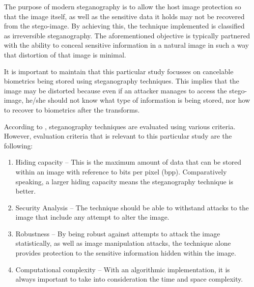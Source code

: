 The purpose of modern steganography is to allow the host image protection so that the image itself, as well as the sensitive data it holds may not be recovered from the stego-image. By achieving this, the technique implemented is classified as irreversible steganography. The aforementioned objective is typically partnered with the ability to conceal sensitive information in a natural image in such a way that distortion of that image is minimal.

It is important to maintain that this particular study focusses on cancelable biometrics being stored using steganography techniques. This implies that the image may be distorted because even if an attacker manages to access the stego-image, he/she should not know what type of information is being stored, nor how to recover to biometrics after the transforms. 

According to \cite{Jain2016, Pradhan2016}, steganography techniques are evaluated using various criteria. However, evaluation criteria that is relevant to this particular study are the following:

\begin{enumerate}[label=\roman*.]
	
	\item Hiding capacity – This is the maximum amount of data that can be stored within an image with reference to bits per pixel (bpp). Comparatively speaking, a larger hiding capacity means the steganography technique is better.
	
	\item Security Analysis – The technique should be able to withstand attacks to the image that include any attempt to alter the image.
	
	\item Robustness – By being robust against attempts to attack the image statistically, as well as image manipulation attacks, the technique alone provides protection to the sensitive information hidden within the image. 
	
	\item Computational complexity – With an algorithmic implementation, it is always important to take into consideration the time and space complexity.

\end{enumerate}
	
